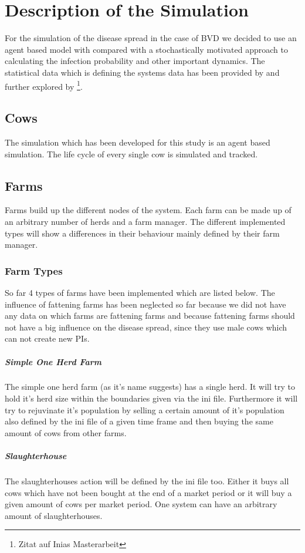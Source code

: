 \chapter{Description of the Simulation}
For the simulation of the disease spread in the case of BVD we decided to use an agent based model with compared with a stochastically motivated approach to calculating the infection probability and other important dynamics. The statistical data which is defining the systems data has been provided by \citep{personalCom} and further explored by \footnote{Zitat auf Inias Masterarbeit}.
\section{Cows}
The simulation which has been developed for this study is an agent based simulation. The life cycle of every single cow is simulated and tracked. 
\section{Farms}
Farms build up the different nodes of the system. Each farm can be made up of an arbitrary number of herds and a farm manager. The different implemented types will show a differences in their behaviour mainly defined by their farm manager.
\subsection{Farm Types}
So far 4 types of farms have been implemented which are listed below. The influence of fattening farms has been neglected so far because we did not have any data on which farms are fattening farms and because fattening farms should not have a big influence on the disease spread, since they use male cows which can not create new PIs.
\paragraph{Simple One Herd Farm}
The simple one herd farm (as it's name suggests) has a single herd. It will try to hold it's herd size within the boundaries given via the ini file. Furthermore it will try to rejuvinate it's population by selling a certain amount of it's population also defined by the ini file of a given time frame and then buying the same amount of cows from other farms. 
\paragraph{Slaughterhouse}
The slaughterhouses action will be defined by the ini file too. Either it buys all cows which have not been bought at the end of a market period or it will buy a given amount of cows per market period. One system can have an arbitrary amount of slaughterhouses.
